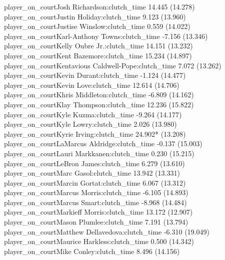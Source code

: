 \documentclass[
  landscape]{article}
\begin{document}
player\_on\_courtJosh Richardson:clutch\_time 14.445 (14.278)\\
player\_on\_courtJustin Holiday:clutch\_time 9.123 (13.960)\\
player\_on\_courtJustise Winslow:clutch\_time 0.559 (14.022)\\
player\_on\_courtKarl-Anthony Towns:clutch\_time -7.156 (13.346)\\
player\_on\_courtKelly Oubre Jr.:clutch\_time 14.151 (13.232)\\
player\_on\_courtKent Bazemore:clutch\_time 15.234 (14.897)\\
player\_on\_courtKentavious Caldwell-Pope:clutch\_time 7.072 (13.262)\\
player\_on\_courtKevin Durant:clutch\_time -1.124 (14.477)\\
player\_on\_courtKevin Love:clutch\_time 12.614 (14.706)\\
player\_on\_courtKhris Middleton:clutch\_time -6.809 (14.162)\\
player\_on\_courtKlay Thompson:clutch\_time 12.236 (15.822)\\
player\_on\_courtKyle Kuzma:clutch\_time -9.264 (14.177)\\
player\_on\_courtKyle Lowry:clutch\_time 2.026 (13.980)\\
player\_on\_courtKyrie Irving:clutch\_time 24.902* (13.208)\\
player\_on\_courtLaMarcus Aldridge:clutch\_time -0.137 (15.003)\\
player\_on\_courtLauri Markkanen:clutch\_time 0.230 (15.215)\\
player\_on\_courtLeBron James:clutch\_time 6.279 (13.610)\\
player\_on\_courtMarc Gasol:clutch\_time 13.942 (13.331)\\
player\_on\_courtMarcin Gortat:clutch\_time 6.067 (13.312)\\
player\_on\_courtMarcus Morris:clutch\_time -6.105 (14.893)\\
player\_on\_courtMarcus Smart:clutch\_time -8.968 (14.484)\\
player\_on\_courtMarkieff Morris:clutch\_time 13.172 (12.907)\\
player\_on\_courtMason Plumlee:clutch\_time 7.191 (13.794)\\
player\_on\_courtMatthew Dellavedova:clutch\_time -6.310 (19.049)\\
player\_on\_courtMaurice Harkless:clutch\_time 0.500 (14.342)\\
player\_on\_courtMike Conley:clutch\_time 8.496 (14.156)\\
\end{document}

